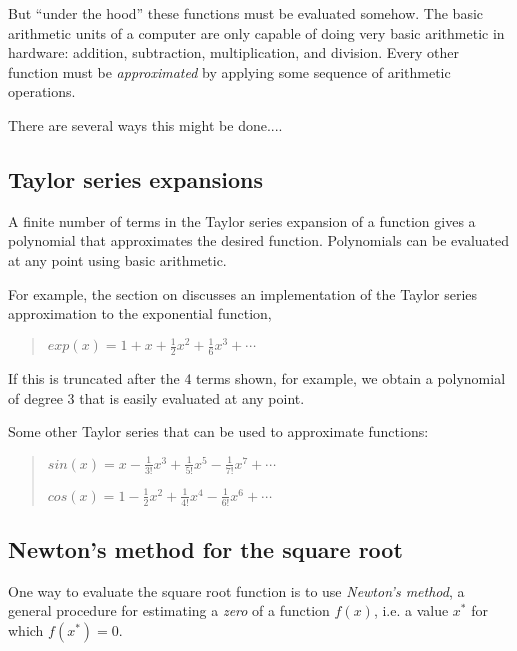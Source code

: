 \documentclass[letterpaper,10pt,english]{sphinxmanual}
\begin{document}
But ``under the hood'' these functions must be evaluated somehow.  The basic
arithmetic units of a computer are only capable of doing very basic
arithmetic in hardware: addition, subtraction, multiplication, and division.
Every other function must be \emph{approximated} by applying some sequence of
arithmetic operations.

There are several ways this might be done....


\subsection{Taylor series expansions}
\label{special_functions:taylor-series-expansions}
A finite number of terms in the Taylor series expansion of a function gives
a polynomial that approximates the desired function.  Polynomials can be
evaluated at any point using basic arithmetic.

For example, the section on {\hyperref[fortran_taylor:fortran\string-taylor]{}} discusses an
implementation of the Taylor series approximation to the exponential
function,
\begin{quote}

\(exp(x) = 1 + x + \frac 1 2 x ^2 + \frac 1 6 x^3 + \cdots\)
\end{quote}

If this is truncated after the 4 terms shown, for example, we obtain a
polynomial of degree 3 that is easily evaluated at any point.

Some other Taylor series that can be used to approximate functions:
\begin{quote}

\(sin(x) = x - \frac{1}{3!} x^3 + \frac 1 {5!} x^5 - \frac{1}{7!} x^7 + \cdots\)

\(cos(x) = 1 - \frac 1 2 x^2 + \frac{1}{4!} x^4 - \frac{1}{6!} x^6 + \cdots\)
\end{quote}


\subsection{Newton's method for the square root}
\label{special_functions:newton-s-method-for-the-square-root}\label{special_functions:special-newton}
One way to evaluate the square root function is to use \emph{Newton's method}, a
general procedure for estimating a \emph{zero} of a function \(f(x)\), i.e. a
value \(x^*\) for which \(f(x^*) = 0\).
\end{document}
